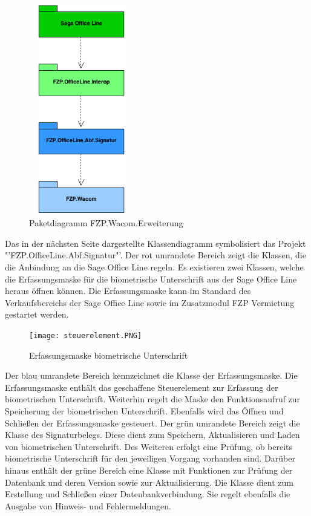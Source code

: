 \begin{figure}[!ht]
    \centering
    \includegraphics[height=260pt, width=130pt]{paketDiagrammNeu2.png}
    \caption[Paketdiagramm FZP.Wacom.Erweiterung]{\small{Paketdiagramm FZP.Wacom.Erweiterung}}
\end{figure}
\newline
Das in der nächsten Seite dargestellte Klassendiagramm symbolisiert das Projekt "'FZP.OfficeLine.Abf.Signatur"'. Der rot umrandete Bereich zeigt die Klassen, die die Anbindung an die Sage Office Line regeln. Es existieren zwei Klassen, welche die Erfassungsmaske für die biometrische Unterschrift aus der Sage Office Line heraus öffnen können. Die Erfassungsmaske kann im Standard des Verkaufsbereichs der Sage Office Line sowie im Zusatzmodul FZP Vermietung gestartet werden.
\begin{figure}[!ht]
    \centering
    \texttt{[image: steuerelement.PNG]}
    \caption[Erfassungsmaske biometrische Unterschrift]{\small{Erfassungsmaske biometrische Unterschrift}}
\end{figure}
\newline
Der blau umrandete Bereich kennzeichnet die Klasse der Erfassungsmaske. Die Erfassungsmaske enthält das geschaffene Steuerelement zur Erfassung der biometrischen Unterschrift. Weiterhin regelt die Maske den Funktionsaufruf zur Speicherung der biometrischen Unterschrift. Ebenfalls wird das Öffnen und Schließen der Erfassungsmaske gesteuert. Der grün umrandete Bereich zeigt die Klasse des Signaturbelegs. Diese dient zum Speichern, Aktualisieren und Laden von biometrischen Unterschrift. Des Weiteren erfolgt eine Prüfung, ob bereits biometrische Unterschrift für den jeweiligen Vorgang vorhanden sind. Darüber hinaus enthält der grüne Bereich eine Klasse mit Funktionen zur Prüfung der Datenbank und deren Version sowie zur Aktualisierung. Die Klasse dient zum Erstellung und Schließen einer Datenbankverbindung. Sie regelt ebenfalls die Ausgabe von Hinweis- und Fehlermeldungen.
